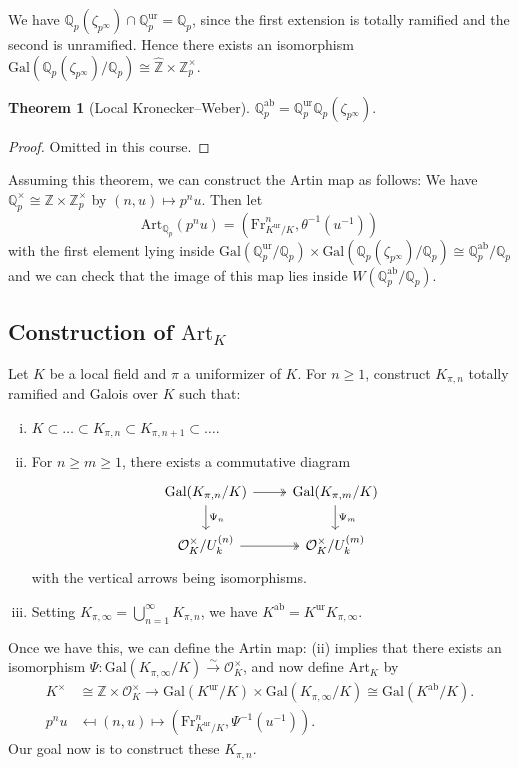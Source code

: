 \documentclass{article}
\theoremstyle{definition}
\newtheorem{theorem}{Theorem}[section]
\begin{document}
We have $\mathbb{Q}_p(\zeta_{p^{\infty}}) \cap \mathbb{Q}_p^{\text{ur}} = \mathbb{Q}_p$, since the first extension is totally ramified and the second is unramified. Hence there exists an isomorphism $\text{Gal}(\mathbb{Q}_p(\zeta_{p^{\infty}})/\mathbb{Q}_p) \cong \hat{\mathbb{Z}} \times \mathbb{Z}_p^\times$.
\begin{theorem}[Local Kronecker--Weber]
    $\mathbb{Q}_p^{\text{ab}} = \mathbb{Q}_p^{\text{ur}} \mathbb{Q}_p(\zeta_{p^{\infty}})$.
\end{theorem}
\begin{proof}
    Omitted in this course.
\end{proof}
Assuming this theorem, we can construct the Artin map as follows: We have $\mathbb{Q}_p^\times \cong \mathbb{Z} \times \mathbb{Z}_p^\times$ by $(n,u) \mapsto p^n u$. Then let $$\text{Art}_{\mathbb{Q}_p}(p^n u) = (\text{Fr}_{K^{\text{ur}}/K}^n, \theta^{-1}(u^{-1}))$$ with the first element lying inside $\text{Gal}(\mathbb{Q}_p^{\text{ur}}/\mathbb{Q}_p) \times \text{Gal}(\mathbb{Q}_p(\zeta_{p^{\infty}})/\mathbb{Q}_p) \cong \mathbb{Q}_p^{\text{ab}}/\mathbb{Q}_p$ and we can check that the image of this map lies inside $W(\mathbb{Q}_p^{\text{ab}}/\mathbb{Q}_p)$.

\subsection{Construction of $\text{Art}_K$}
Let $K$ be a local field and $\pi$ a uniformizer of $K$. For $n \ge 1$, construct $K_{\pi,n}$ totally ramified and Galois over $K$ such that:
\begin{enumerate}[(i)]
    \item $K \subset \ldots \subset K_{\pi, n} \subset K_{\pi, n+1} \subset \ldots$.
    \item For $n \ge m\ge 1$, there exists a commutative diagram $$\begin{tikzcd}
        \text{Gal}(K_{\pi, n}/K) & \text{Gal}(K_{\pi, m}/K) \\
        \mathcal{O}_K^\times/U_k^{(n)} & \mathcal{O}_K^\times/U_k^{(m)}
        \arrow["\Psi_n", from=1-1, to=2-1]
        \arrow["", from=1-1, to=1-2, two heads]
        \arrow["", from=2-1, to=2-2, two heads]
        \arrow["\Psi_m", from=1-2, to=2-2]
    \end{tikzcd}$$
    with the vertical arrows being isomorphisms.
    \item Setting $K_{\pi, \infty} = \bigcup_{n=1}^{\infty} K_{\pi,n}$, we have $K^{\text{ab}} = K^{\text{ur}}K_{\pi, \infty}$.
\end{enumerate}
Once we have this, we can define the Artin map: (ii) implies that there exists an isomorphism $\Psi : \text{Gal}(K_{\pi, \infty}/K) \stackrel{\sim}{\to} \mathcal{O}_K^\times$, and now define $\text{Art}_K$ by 
\begin{align*}
    K^{\times} &\cong \mathbb{Z} \times \mathcal{O}_K^\times \to \text{Gal}(K^{\text{ur}}/K)\times\text{Gal}(K_{\pi, \infty}/K) \cong \text{Gal}(K^{\text{ab}}/K).\\
    p^n u &\mapsfrom (n,u) \mapsto (\text{Fr}_{K^{\text{ur}}/K}^n, \Psi^{-1}(u^{-1})).
\end{align*}
Our goal now is to construct these $K_{\pi, n}$.
\end{document}
